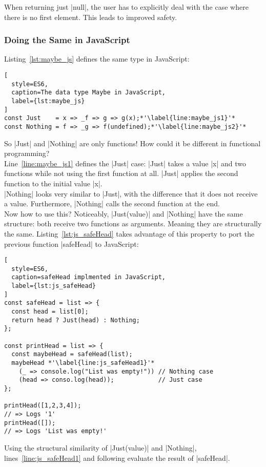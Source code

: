 When returning just |null|, the user has to explicitly deal with the case where
there is no first element. This leads to improved safety.

\subsubsection{Doing the Same in JavaScript} %
\label{subsub:Doing the same in JavaScript}
Listing~\ref{lst:maybe_js} defines the same type in JavaScript:
\begin{lstlisting}[
  style=ES6,
  caption=The data type Maybe in JavaScript,
  label={lst:maybe_js}
]
const Just    = x => _f => g => g(x);*'\label{line:maybe_js1}'*
const Nothing = f => _g => f(undefined);*'\label{line:maybe_js2}'*
\end{lstlisting}

So |Just| and |Nothing| are only functions! How could it be different in
functional programming? \\ 
Line~\ref{line:maybe_js1} defines the |Just| case:
|Just| takes a value |x| and two functions while not using the first function
at all. |Just| applies the second function to the initial value |x|. \\ 
|Nothing| looks very similar to |Just|, with the difference that it does not
receive a value. Furthermore, |Nothing| calls the second function at the end.\\ 
Now how to use this? Noticeably, |Just(value)| and |Nothing| have the same
structure: both receive two functions as arguments. Meaning they are
structurally the same. Listing~\ref{lst:js_safeHead} takes advantage of this
property to port the previous function |safeHead| to JavaScript:

\begin{lstlisting}[
  style=ES6,
  caption=safeHead implmented in JavaScript,
  label={lst:js_safeHead}
]
const safeHead = list => {
  const head = list[0];
  return head ? Just(head) : Nothing;
};

const printHead = list => {
  const maybeHead = safeHead(list);
  maybeHead *'\label{line:js_safeHead1}'*
    (_ => console.log("List was empty!")) // Nothing case
    (head => conso.log(head));            // Just case
};

printHead([1,2,3,4]);
// => Logs '1'
printHead([]);
// => Logs 'List was empty!'
\end{lstlisting}

Using the structural similarity of |Just(value)| and |Nothing|,
lines~\ref{line:js_safeHead1} and following evaluate the result of |safeHead|.

